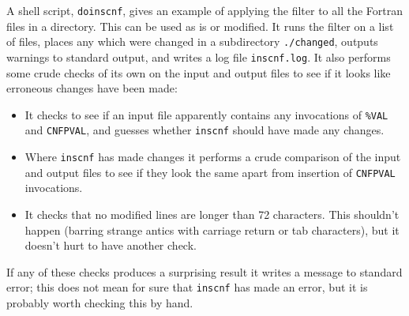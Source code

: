 \documentclass[twoside,11pt]{article}
\renewcommand{\_}{\texttt{\symbol{95}}}
\begin{document}
A shell script, {\tt do\_inscnf}, gives an example of applying the filter
to all the Fortran files in a directory.  This can be used as is
or modified.
It runs the filter on a list of files, places any which were changed
in a subdirectory {\tt ./changed}, outputs warnings to standard
output, and writes a log file {\tt inscnf.log}.
It also performs some crude checks of its own on the input and output
files to see if it looks like erroneous changes have been made:
\begin{itemize}
\item 
It checks to see if an input file apparently contains any invocations
of {\tt \%VAL} and {\tt CNF\_PVAL}, and guesses whether {\tt inscnf} 
should have made any changes.
\item
Where {\tt inscnf} has made changes it performs a crude comparison of
the input and output files to see if they look the same apart from
insertion of {\tt CNF\_PVAL} invocations.
\item
It checks that no modified lines are longer than 72 characters.
This shouldn't happen (barring strange antics with carriage return
or tab characters), but it doesn't hurt to have another check.
\end{itemize}
If any of these checks produces a surprising result it writes a 
message to standard error; this does not mean for sure 
that {\tt inscnf} has made an error, 
but it is probably worth checking this by hand.







\end{document}
